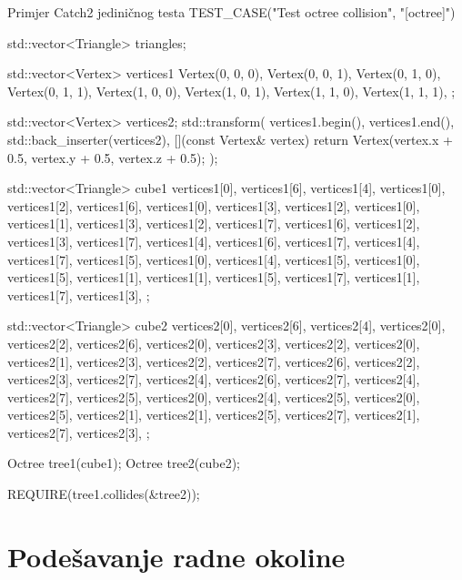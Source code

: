 \begin{cppSource}{Primjer Catch2 jediničnog testa}
TEST_CASE("Test octree collision", "[octree]") {
    std::vector<Triangle> triangles;

    std::vector<Vertex> vertices1{
        Vertex(0, 0, 0),
        Vertex(0, 0, 1),
        Vertex(0, 1, 0),
        Vertex(0, 1, 1),
        Vertex(1, 0, 0),
        Vertex(1, 0, 1),
        Vertex(1, 1, 0),
        Vertex(1, 1, 1),
    };

    std::vector<Vertex> vertices2;
    std::transform(
        vertices1.begin(),
        vertices1.end(),
        std::back_inserter(vertices2),
        [](const Vertex& vertex) {
            return Vertex(vertex.x + 0.5, vertex.y + 0.5, vertex.z + 0.5);
        }
    );

    std::vector<Triangle> cube1{
        {vertices1[0], vertices1[6], vertices1[4]},
        {vertices1[0], vertices1[2], vertices1[6]},
        {vertices1[0], vertices1[3], vertices1[2]},
        {vertices1[0], vertices1[1], vertices1[3]},
        {vertices1[2], vertices1[7], vertices1[6]},
        {vertices1[2], vertices1[3], vertices1[7]},
        {vertices1[4], vertices1[6], vertices1[7]},
        {vertices1[4], vertices1[7], vertices1[5]},
        {vertices1[0], vertices1[4], vertices1[5]},
        {vertices1[0], vertices1[5], vertices1[1]},
        {vertices1[1], vertices1[5], vertices1[7]},
        {vertices1[1], vertices1[7], vertices1[3]},
    };

    std::vector<Triangle> cube2{
        {vertices2[0], vertices2[6], vertices2[4]},
        {vertices2[0], vertices2[2], vertices2[6]},
        {vertices2[0], vertices2[3], vertices2[2]},
        {vertices2[0], vertices2[1], vertices2[3]},
        {vertices2[2], vertices2[7], vertices2[6]},
        {vertices2[2], vertices2[3], vertices2[7]},
        {vertices2[4], vertices2[6], vertices2[7]},
        {vertices2[4], vertices2[7], vertices2[5]},
        {vertices2[0], vertices2[4], vertices2[5]},
        {vertices2[0], vertices2[5], vertices2[1]},
        {vertices2[1], vertices2[5], vertices2[7]},
        {vertices2[1], vertices2[7], vertices2[3]},
    };

    Octree tree1(cube1);
    Octree tree2(cube2);

    REQUIRE(tree1.collides(&tree2));
}
\end{cppSource}


\section{Podešavanje radne okoline}

